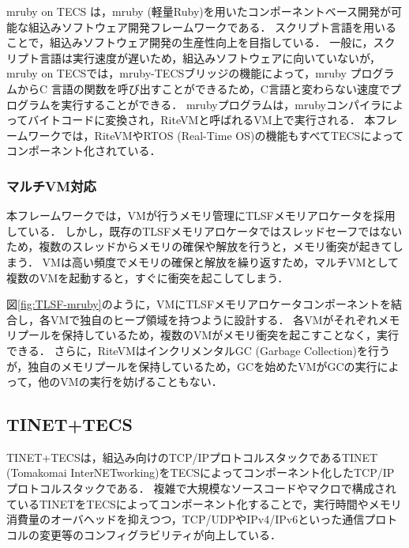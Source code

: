 \documentclass[submit]{ipsj_v2/UTF8/ipsj}
\begin{document}
mruby on TECS は，mruby (軽量Ruby)を用いたコンポーネントベース開発が可能な組込みソフトウェア開発フレームワークである．
スクリプト言語を用いることで，組込みソフトウェア開発の生産性向上を目指している．
一般に，スクリプト言語は実行速度が遅いため，組込みソフトウェアに向いていないが，mruby on TECSでは，mruby-TECSブリッジの機能によって，mruby プログラムからC 言語の関数を呼び出すことができるため，C言語と変わらない速度でプログラムを実行することができる．
mrubyプログラムは，mrubyコンパイラによってバイトコードに変換され，RiteVMと呼ばれるVM上で実行される．
本フレームワークでは，RiteVMやRTOS (Real-Time OS)の機能もすべてTECSによってコンポーネント化されている．


\subsubsection{マルチVM対応}

本フレームワークでは，VMが行うメモリ管理にTLSFメモリアロケータを採用している．
しかし，既存のTLSFメモリアロケータではスレッドセーフではないため，複数のスレッドからメモリの確保や解放を行うと，メモリ衝突が起きてしまう．
VMは高い頻度でメモリの確保と解放を繰り返すため，マルチVMとして複数のVMを起動すると，すぐに衝突を起こしてしまう．

図\ref{fig:TLSF-mruby}のように，VMにTLSFメモリアロケータコンポーネントを結合し，各VMで独自のヒープ領域を持つように設計する．
各VMがそれぞれメモリプールを保持しているため，複数のVMがメモリ衝突を起こすことなく，実行できる．
さらに，RiteVMはインクリメンタルGC (Garbage Collection)を行うが，独自のメモリプールを保持しているため，GCを始めたVMがGCの実行によって，他のVMの実行を妨げることもない．
    
\subsection{TINET+TECS}
\label{sec:TINET+TECS}

TINET+TECSは，組込み向けのTCP/IPプロトコルスタックであるTINET (Tomakomai InterNETworking)をTECSによってコンポーネント化したTCP/IPプロトコルスタックである．
複雑で大規模なソースコードやマクロで構成されているTINETをTECSによってコンポーネント化することで，実行時間やメモリ消費量のオーバヘッドを抑えつつ，TCP/UDPやIPv4/IPv6といった通信プロトコルの変更等のコンフィグラビリティが向上している．
\end{document}
